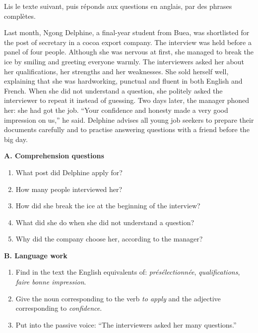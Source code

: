 \documentclass[11pt]{article}
\newcounter{popsec}
\newcounter{popsub}
\newcommand{\courssub}[1]{%
  \stepcounter{popsub}%
  \par\vspace{9pt}\noindent{\popxbold\fontsize{11.5}{13}\selectfont\color{popink}{\color{poporange}\thepopsec.\thepopsub}\hspace{6pt}#1}\par\nopagebreak\vspace{4pt}
}
\begin{document}
\courssub{Je me prépare au Bac}

\begin{exercice}
Lis le texte suivant, puis réponds aux questions en anglais, par des phrases complètes.
\begin{textebox}
Last month, Ngong Delphine, a final-year student from Buea, was shortlisted for the post of secretary in a cocoa export company. The interview was held before a panel of four people. Although she was nervous at first, she managed to break the ice by smiling and greeting everyone warmly. The interviewers asked her about her qualifications, her strengths and her weaknesses. She sold herself well, explaining that she was hardworking, punctual and fluent in both English and French. When she did not understand a question, she politely asked the interviewer to repeat it instead of guessing. Two days later, the manager phoned her: she had got the job. “Your confidence and honesty made a very good impression on us,” he said. Delphine advises all young job seekers to prepare their documents carefully and to practise answering questions with a friend before the big day.
\end{textebox}
\textbf{A. Comprehension questions}
\begin{enumerate}
\item What post did Delphine apply for?
\item How many people interviewed her?
\item How did she break the ice at the beginning of the interview?
\item What did she do when she did not understand a question?
\item Why did the company choose her, according to the manager?
\end{enumerate}
\textbf{B. Language work}
\begin{enumerate}
\item Find in the text the English equivalents of: \emph{présélectionnée}, \emph{qualifications}, \emph{faire bonne impression}.
\item Give the noun corresponding to the verb \emph{to apply} and the adjective corresponding to \emph{confidence}.
\item Put into the passive voice: “The interviewers asked her many questions.”
\end{enumerate}
\end{exercice}
\end{document}
